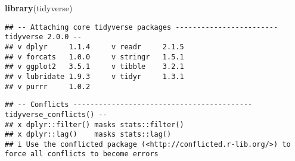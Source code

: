 \documentclass[
]{article}
\newenvironment{Shaded}{\begin{snugshade}}{\end{snugshade}}
\newcommand{\FunctionTok}[1]{\textcolor[rgb]{0.13,0.29,0.53}{\textbf{#1}}}
\newcommand{\NormalTok}[1]{#1}
\begin{document}
\begin{Shaded}
\begin{Highlighting}[]
\FunctionTok{library}\NormalTok{(tidyverse)}
\end{Highlighting}
\end{Shaded}

\begin{verbatim}
## -- Attaching core tidyverse packages ------------------------ tidyverse 2.0.0 --
## v dplyr     1.1.4     v readr     2.1.5
## v forcats   1.0.0     v stringr   1.5.1
## v ggplot2   3.5.1     v tibble    3.2.1
## v lubridate 1.9.3     v tidyr     1.3.1
## v purrr     1.0.2
\end{verbatim}

\begin{verbatim}
## -- Conflicts ------------------------------------------ tidyverse_conflicts() --
## x dplyr::filter() masks stats::filter()
## x dplyr::lag()    masks stats::lag()
## i Use the conflicted package (<http://conflicted.r-lib.org/>) to force all conflicts to become errors
\end{verbatim}
\end{document}

